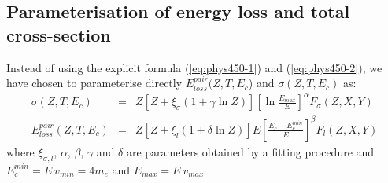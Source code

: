 \subsection{Parameterisation of energy loss and total cross-section}
Instead of using the explicit formula (\ref{eq:phys450-1}) and
(\ref{eq:phys450-2}), we have chosen to parameterise directly 
$E_{loss}^{pair}(Z,T, E_c $) and $\sigma(Z,T,E_c)$ as:
\begin{eqnarray}
\label{eq:phys450-3}
\sigma (Z,T,E_c) & = & Z [Z+ \xi_{\sigma} (1+ \gamma \ln Z)]
     \left [\ln \frac{E_{max}}{E}\right]^{\alpha}
      F_{\sigma} (Z,X,Y)                           \\
E_{loss}^{pair}(Z,T,E_c)      & = & Z [Z+ \xi_l (1+ \delta \ln Z)] E
\label{eq:phys450-4}
      \left [ \frac{E_c - E_c^{min}}{E}\right]^{\beta}
     F_l(Z,X,Y)
\end{eqnarray}
where  $\xi_{\sigma,l}$, $\alpha$, $\beta$, $\gamma$ and $\delta$
are parameters obtained by a fitting procedure and
$ E_c^{min} = E\:v_{min} = 4 m_{e}$ and
$ E_{max} = E\:v_{max}$
 
